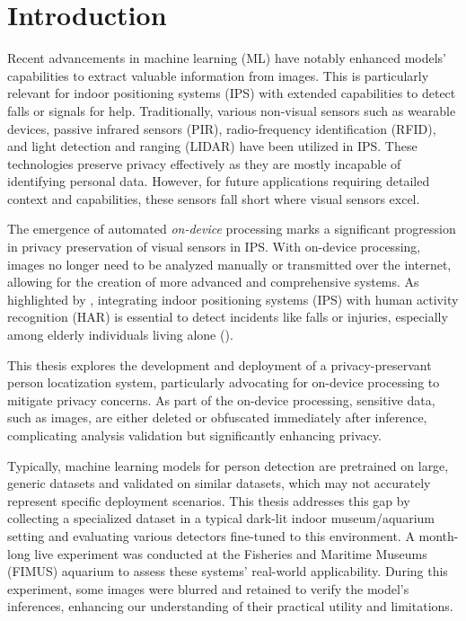 \section{Introduction}
\label{sec:introduction}
Recent advancements in machine learning (ML) have notably enhanced models' capabilities to extract valuable information from images. This is particularly relevant for indoor positioning systems (IPS) with extended capabilities to detect falls or signals for help. Traditionally, various non-visual sensors such as wearable devices, passive infrared sensors (PIR), radio-frequency identification (RFID), and light detection and ranging (LIDAR) have been utilized in IPS. These technologies preserve privacy effectively as they are mostly incapable of identifying personal data. However, for future applications requiring detailed context and capabilities, these sensors fall short where visual sensors excel.

The emergence of automated \textit{on-device} processing marks a significant progression in privacy preservation of visual sensors in IPS. With on-device processing, images no longer need to be analyzed manually or transmitted over the internet, allowing for the creation of more advanced and comprehensive systems. As highlighted by \citeauthor{s22218119}, integrating indoor positioning systems (IPS) with human activity recognition (HAR) is essential to detect incidents like falls or injuries, especially among elderly individuals living alone (\citeyear{s22218119}). 

This thesis explores the development and deployment of a privacy-preservant person locatization system, particularly advocating for on-device processing to mitigate privacy concerns. As part of the on-device processing, sensitive data, such as images, are either deleted or obfuscated immediately after inference, complicating analysis validation but significantly enhancing privacy.

Typically, machine learning models for person detection are pretrained on large, generic datasets and validated on similar datasets, which may not accurately represent specific deployment scenarios. This thesis addresses this gap by collecting a specialized dataset in a typical dark-lit indoor museum/aquarium setting and evaluating various detectors fine-tuned to this environment. A month-long live experiment was conducted at the Fisheries and Maritime Museums (FIMUS) aquarium to assess these systems' real-world applicability. During this experiment, some images were blurred and retained to verify the model's inferences, enhancing our understanding of their practical utility and limitations.

